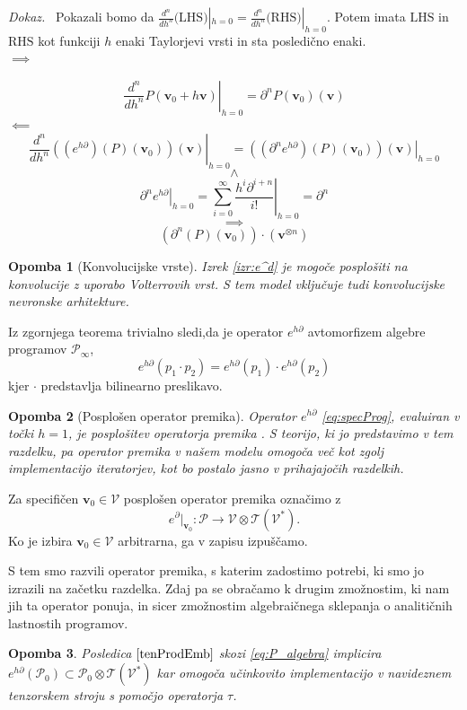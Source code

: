 \documentclass[a4paper, 12pt]{book}
\newcommand{\ed}{e^{h\partial}}
\newcommand{\T}{\mathcal{T}}
\newcommand{\VV}{\mathcal{V}}
\newcommand{\vv}{\mathbf{v}}
\newcommand{\dP}{\mathcal{P}}
\newcommand{\D}{\partial}
\newcommand{\sumd}{\tau}
\newtheorem{opomba}{Opomba}[chapter]
\newenvironment{dokaz}{\emph{Dokaz.}\ }{\hspace{\fill}{$\Box$}}
\begin{document}
 \begin{dokaz}
Pokazali bomo da $\frac{d^n}{dh^n}\text{(LHS)}|_{h=0}=\frac{d^n}{dh^n}\text{(RHS)}|_{h=0}$. Potem imata $\text{LHS}$ in $\text{RHS}$ kot funkciji $h$ enaki Taylorjevi vrsti in sta posledično enaki.\\
 $\implies$
 
 $$\left. \frac{d^n}{dh^n}P(\vv_0+h\vv)\right|_{h=0}=\D^n P(\vv_0)(\vv)$$
 $\impliedby$
 $$\left. \frac{d^n}{dh^n}\left((e^{h\D})(P)(\vv_0)\right)(\vv)\right|_{h=0}=
\left. \left((\D^n e^{h\D})(P)(\vv_0)\right)(\vv)\right|_{h=0}$$
 $$\land$$
 $$\left. \D^ne^{h\D}\right| _{h=0}=\left. \sum\limits_{i=0}^{\infty}\frac{h^i\D^{i+n}}{i!}\right|_{h=0}=\D^n$$
 $$\implies$$
 $$\left(\D^n(P)(\vv_0)\right)\cdot(\vv^{\otimes n})$$
 \end{dokaz}
 \begin{opomba}[Konvolucijske vrste]
 \label{konvVrst}
 Izrek \ref{izr:e^d} je mogoče posplošiti na konvolucije z uporabo Volterrovih vrst. S tem model vključuje tudi konvolucijske nevronske arhitekture.
 \end{opomba}
 
 \noindent Iz zgornjega teorema trivialno sledi,da je operator $\ed$ avtomorfizem algebre programov $\dP_\infty$,
 \begin{equation}\label{eq:prod}
  	e^{h\D}(p_1\cdot p_2)=e^{h\D}(p_1)\cdot e^{h\D}(p_2)
  \end{equation}
  kjer $\cdot$ predstavlja bilinearno preslikavo.
\begin{opomba}[Posplošen operator premika]\label{rmrk:genShift}
Operator $e^{h\D}$ \eqref{eq:specProg}, evaluiran v točki $h=1$, je posplošitev operatorja premika \cite{OpCalc}. S teorijo, ki jo predstavimo v tem razdelku, pa operator premika v našem modelu omogoča več kot zgolj implementacijo iteratorjev, kot bo postalo jasno v prihajajočih razdelkih.
\end{opomba}

\noindent Za specifičen $\vv_0\in\VV$ posplošen operator premika označimo z
 \begin{equation*}
 e^\D\vert_{\vv_0}:\dP\to \VV\otimes \T(\VV^*).
 \end{equation*}
Ko je izbira $\vv_0\in\VV$ arbitrarna, ga v zapisu izpuščamo.

S tem smo razvili operator premika, s katerim zadostimo potrebi, ki smo jo izrazili na začetku razdelka. Zdaj pa se obračamo k drugim zmožnostim, ki nam jih ta operator ponuja, in sicer zmožnostim algebraičnega sklepanja o analitičnih lastnostih programov.
 \begin{opomba}
 Posledica $\ref{tenProdEmb}$ skozi \eqref{eq:P_algebra} implicira
      	$e^{h\D}(\dP_0)\subset\dP_0\otimes \T(\VV^*)$      
 kar omogoča učinkovito implementacijo v navideznem tenzorskem stroju s pomočjo operatorja $\sumd$. 
\end{opomba}
\end{document}
